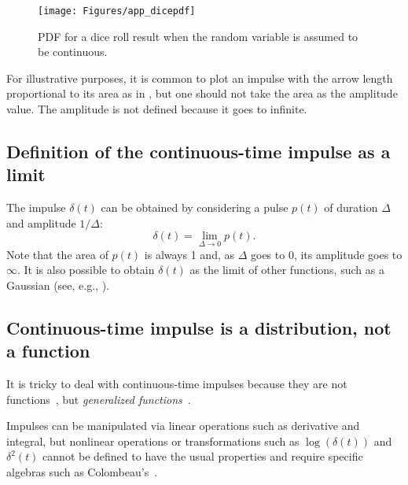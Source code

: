 \begin{figure}
	\centering
		\texttt{[image: Figures/app\_dicepdf]}		
	\caption{PDF for a dice roll result when the random variable is assumed to be continuous.\label{fig:app_dicepdf}}
\end{figure}

For illustrative purposes, it is common to plot an impulse with the arrow length proportional to its area as in , but one should not take the area as the amplitude value. The amplitude is not defined because it goes to infinite.

\subsection{Definition of the continuous-time impulse as a limit}

The impulse $\delta(t)$ can be obtained by considering a pulse $p(t)$ of duration $\Delta$ and amplitude $1/\Delta$:
\begin{equation}
\delta(t) = \lim_{\Delta \rightarrow 0} p(t).
\label{eq:diracDeltaDefinition}
\end{equation}
Note that the area of $p(t)$ is always 1 and, as $\Delta$ goes to 0, its amplitude goes to $\infty$. It is also possible to obtain $\delta(t)$ as the limit of other functions, such as a Gaussian (see, e.g., ).


\subsection{Continuous-time impulse is a distribution, not a function}
\label{sec:impulseIsNotAFunction}

It is tricky to deal with continuous-time impulses because they are not functions~\cite{Candan21}, but \emph{generalized functions}~. 

Impulses can be manipulated via linear operations such as derivative and integral, but nonlinear operations or transformations such as $\log(\delta(t))$ and $\delta^2(t)$ cannot be defined to have the usual properties and require specific algebras such as Colombeau's~. 

